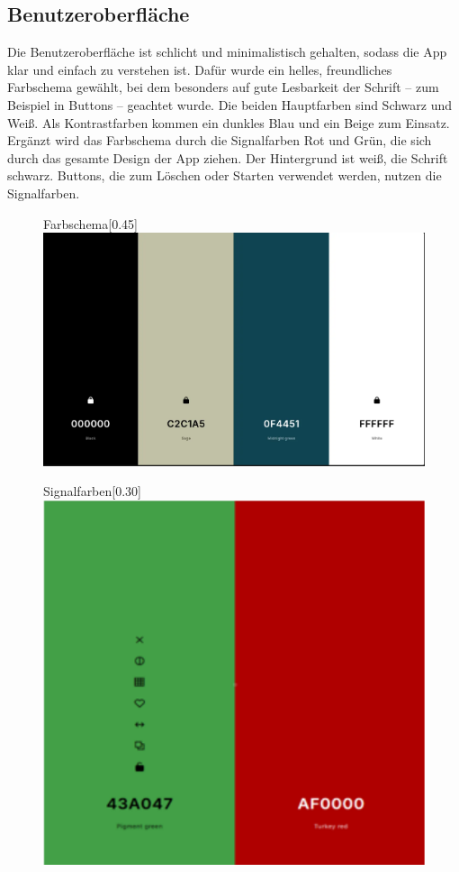 \documentclass[12pt,a4paper]{article}
\begin{document}
\subsection{Benutzeroberfläche}
Die Benutzeroberfläche ist schlicht und minimalistisch gehalten, sodass die App klar und einfach zu verstehen ist. Dafür wurde ein helles, freundliches Farbschema gewählt, bei dem besonders auf gute Lesbarkeit der Schrift – zum Beispiel in Buttons – geachtet wurde. Die beiden Hauptfarben sind Schwarz und Weiß. Als Kontrastfarben kommen ein dunkles Blau und ein Beige zum Einsatz. Ergänzt wird das Farbschema durch die Signalfarben Rot und Grün, die sich durch das gesamte Design der App ziehen. Der Hintergrund ist weiß, die Schrift schwarz. Buttons, die zum Löschen oder Starten verwendet werden, nutzen die Signalfarben.

\begin{figure}[h]
    \centering
    \begin{subcaptionbox}{Farbschema\label{fig:bild1}}[0.45\linewidth]
        {\includegraphics[width=\linewidth]{Farbschema.png}}
    \end{subcaptionbox}
    \hfill
    \begin{subcaptionbox}{Signalfarben\label{fig:bild2}}[0.30\linewidth]
        {\includegraphics[width=\linewidth]{Signalfarben.png}}

\end{subcaptionbox}
\end{figure}
\end{document}
